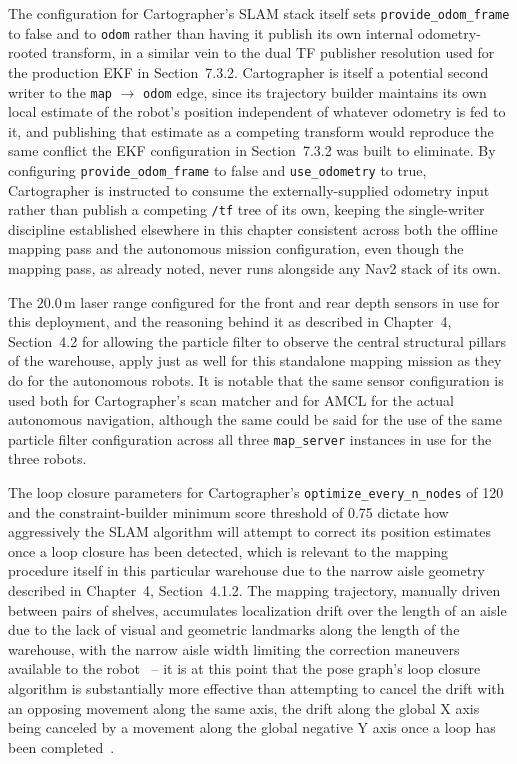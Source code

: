 The configuration for Cartographer's SLAM stack itself sets \texttt{provide\_odom\_frame} to false and \texttt{} to \texttt{odom} rather than having it publish its own internal odometry-rooted transform, in a similar vein to the dual TF publisher resolution used for the production EKF in Section~7.3.2. Cartographer is itself a potential second writer to the \texttt{map} $\rightarrow$ \texttt{odom} edge, since its trajectory builder maintains its own local estimate of the robot's position independent of whatever odometry is fed to it, and publishing that estimate as a competing transform would reproduce the same conflict the EKF configuration in Section~7.3.2 was built to eliminate. By configuring \texttt{provide\_odom\_frame} to false and \texttt{use\_odometry} to true, Cartographer is instructed to consume the externally-supplied odometry input rather than publish a competing \texttt{/tf} tree of its own, keeping the single-writer discipline established elsewhere in this chapter consistent across both the offline mapping pass and the autonomous mission configuration, even though the mapping pass, as already noted, never runs alongside any Nav2 stack of its own.

The $20.0\,\text{m}$ laser range configured for the front and rear depth sensors in use for this deployment, and the reasoning behind it as described in Chapter~4, Section~4.2 for allowing the particle filter to observe the central structural pillars of the warehouse, apply just as well for this standalone mapping mission as they do for the autonomous robots. It is notable that the same sensor configuration is used both for Cartographer's scan matcher and for AMCL for the actual autonomous navigation, although the same could be said for the use of the same particle filter configuration across all three \texttt{map\_server} instances in use for the three robots.

The loop closure parameters for Cartographer's \texttt{optimize\_every\_n\_nodes} of 120 and the constraint-builder minimum score threshold of 0.75 dictate how aggressively the SLAM algorithm will attempt to correct its position estimates once a loop closure has been detected, which is relevant to the mapping procedure itself in this particular warehouse due to the narrow aisle geometry described in Chapter~4, Section~4.1.2. The mapping trajectory, manually driven between pairs of shelves, accumulates localization drift over the length of an aisle due to the lack of visual and geometric landmarks along the length of the warehouse, with the narrow aisle width limiting the correction maneuvers available to the robot~\cite{ribeiro2025indoor} -- it is at this point that the pose graph's loop closure algorithm is substantially more effective than attempting to cancel the drift with an opposing movement along the same axis, the drift along the global X axis being canceled by a movement along the global negative Y axis once a loop has been completed~\cite{hess2016real}.

